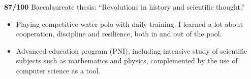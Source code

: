 	\divider

	\textbf{87/100} Baccalaureate thesis: ``Revolutions in history and scientific thought.''
	\medskip\
	\begin{itemize}
		\item Playing competitive water polo with daily training. I learned a lot about cooperation, discipline and resilience, both in and out of the pool.
		\item Advanced education program (PNI), including intensive study of scientific subjects such as mathematics and physics, complemented by the use of computer science as a tool.
	\end{itemize}

	\bigskip

